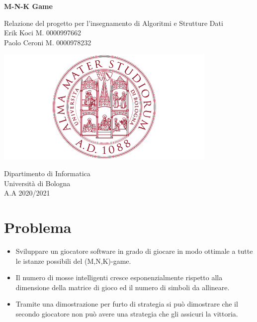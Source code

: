 \documentclass{article}
\begin{document}
\begin{titlepage}

    \begin{center}
        \vspace*{1cm}
        \Huge
        \textbf{M-N-K Game}
            
        \vspace{0.5cm}
        \LARGE
         Relazione del progetto per l'insegnamento di Algoritmi e Strutture Dati \\
        
            
        \vspace{1.5cm}
        \vfill
        Erik Koci M. 0000997662 \\ 
        Paolo Ceroni M. 0000978232
            
        \vspace{0.8cm}
            
        \includegraphics[width=0.8\textwidth]{img/unibo.png}
            
        \Large
        Dipartimento di Informatica\\
        Università di Bologna\\
        A.A 2020/2021\\
            
    \end{center}
\end{titlepage}


\tableofcontents
\newpage

\section{Problema}
\begin{itemize}
    \item Sviluppare un giocatore software in grado di giocare in modo ottimale a tutte le istanze possibili del (M,N,K)-game.
    \item Il numero di mosse intelligenti cresce esponenzialmente rispetto alla dimensione della matrice di gioco ed il numero di simboli da allineare.
    \item Tramite una dimostrazione per furto di strategia si può dimostrare che il secondo giocatore non può avere una strategia che gli assicuri la vittoria.
\end{itemize}
\end{document}
